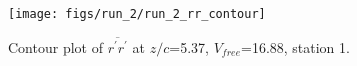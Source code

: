 \begin{figure}[H]
\centering
\texttt{[image: figs/run\_2/run\_2\_rr\_contour]}
\caption{Contour plot of $\overline{r^\prime r^\prime}$ at $z/c$=5.37, $V_{free}$=16.88, station 1.}
\label{fig:run_2_rr_contour}
\end{figure}


